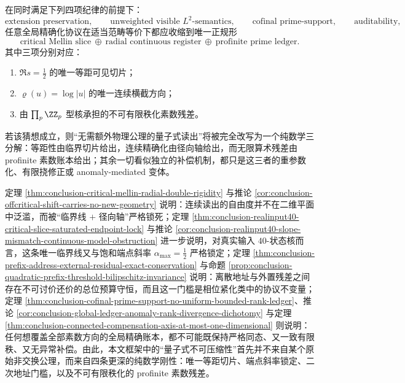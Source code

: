 \begin{conjecture}[全局精确化的正规形唯一性]\label{conj:conclusion-global-exactification-normal-form-uniqueness}
在同时满足下列四项纪律的前提下：
\[
\text{extension preservation},
\qquad
\text{unweighted visible \(L^2\)-semantics},
\qquad
\text{cofinal prime-support},
\qquad
\text{auditability},
\]
任意全局精确化协议在适当范畴等价下都应收缩到唯一正规形
\[
\boxed{
\text{critical Mellin slice}
\ \oplus\
\text{radial continuous register}
\ \oplus\
\text{profinite prime ledger}
}.
\]
其中三项分别对应：
\begin{enumerate}
  \item \(\Re s=\frac12\) 的唯一等距可见切片；
  \item \(\varrho(u)=\log|u|\) 的唯一连续横截方向；
  \item 由 \(\prod_p\ZZ_p\) 型核承担的不可有限秩化素数残差。
\end{enumerate}
若该猜想成立，则“无需额外物理公理的量子式读出”将被完全改写为一个纯数学三分解：等距性由临界切片给出，连续精确化由径向轴给出，而无限算术残差由 profinite 素数账本给出；其余一切看似独立的补偿机制，都只是这三者的重参数化、有限挠修正或 anomaly-mediated 变体。
\end{conjecture}

\begin{remark}[统一读法]\label{rem:conclusion-criticalslice-radial-prefix-prime-ledger-unification}
定理 \ref{thm:conclusion-critical-mellin-radial-double-rigidity} 与推论 \ref{cor:conclusion-offcritical-shift-carries-no-new-geometry} 说明：连续读出的自由度并不在二维平面中泛滥，而被“临界线 \(+\) 径向轴”严格锁死；定理 \ref{thm:conclusion-realinput40-critical-slice-saturated-endpoint-lock} 与推论 \ref{cor:conclusion-realinput40-slope-mismatch-continuous-model-obstruction} 进一步说明，对真实输入 \(40\)-状态核而言，这条唯一临界线又与饱和端点斜率 \(\alpha_{\max}=\frac12\) 严格锁定；定理 \ref{thm:conclusion-prefix-address-external-residual-exact-conservation} 与命题 \ref{prop:conclusion-quadratic-prefix-threshold-bilipschitz-invariance} 说明：离散地址与外置残差之间存在不可讨价还价的总位预算守恒，而且这一门槛是相位紧化类中的协议不变量；定理 \ref{thm:conclusion-cofinal-prime-support-no-uniform-bounded-rank-ledger}、推论 \ref{cor:conclusion-global-ledger-anomaly-rank-divergence-dichotomy} 与定理 \ref{thm:conclusion-connected-compensation-axis-at-most-one-dimensional} 则说明：任何想覆盖全部素数方向的全局精确账本，都不可能既保持严格同态、又一致有限秩、又无异常补偿。由此，本文框架中的“量子式不可压缩性”首先并不来自某个原始非交换公理，而来自四条更深的纯数学刚性：唯一等距切片、端点斜率锁定、二次地址门槛，以及不可有限秩化的 profinite 素数残差。
\end{remark}

\endinput
